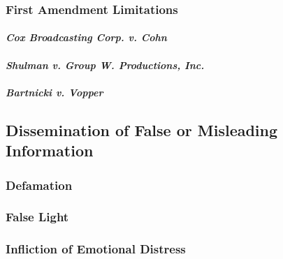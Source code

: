 \subsubsection{First Amendment Limitations}

\paragraph{\emph{Cox Broadcasting Corp. v. Cohn}}


\paragraph{\emph{Shulman v. Group W. Productions, Inc.}}


\paragraph{\emph{Bartnicki v. Vopper}}


\subsection{Dissemination of False or Misleading Information}

\subsubsection{Defamation}


\subsubsection{False Light}


\subsubsection{Infliction of Emotional Distress}

